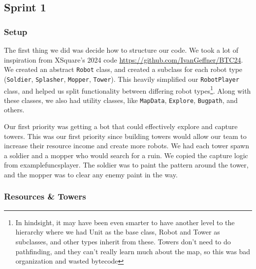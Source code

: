 \documentclass{article}
\begin{document}
  \subsection{Sprint 1}

  \subsubsection{Setup}

  The first thing we did was decide how to structure our code. We took a lot of inspiration from XSquare's 2024 code \url{https://github.com/IvanGeffner/BTC24}. We created an abstract \verb|Robot| class, and created a subclass for each robot type (\verb|Soldier|, \verb|Splasher|, \verb|Mopper|, \verb|Tower|). This heavily simplified our \verb|RobotPlayer| class, and helped us split functionality between differing robot types\footnote{In hindsight, it may have been even smarter to have another level to the hierarchy where we had Unit as the base class, Robot and Tower as subclasses, and other types inherit from these. Towers don't need to do pathfinding, and they can't really learn much about the map, so this was bad organization and wasted bytecode}. Along with these classes, we also had utility classes, like \verb|MapData|, \verb|Explore|, \verb|Bugpath|, and others.

  \medskip

  Our first priority was getting a bot that could effectively explore and capture towers. This was our first priority since building towers would allow our team to increase their resource income and create more robots. We had each tower spawn a soldier and a mopper who would search for a ruin. We copied the capture logic from examplefuncsplayer. The soldier was to paint the pattern around the tower, and the mopper was to clear any enemy paint in the way.

  \subsubsection{Resources \& Towers}
\end{document}
